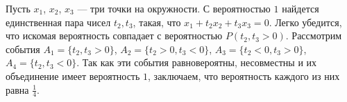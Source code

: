 \documentclass{article}
\begin{document}
Пусть $x_1$, $x_2$, $x_3$ --- три точки на окружности. С вероятностью $1$ найдется единственная пара чисел $t_2, t_3$, такая, что 
$x_1 + t_2 x_2 + t_3 x_3 = 0$. Легко убедится, что искомая вероятность совпадает с вероятностью $P(t_2, t_3 > 0)$. Рассмотрим события $A_1 = \{t_2, t_3 > 0\}$, $A_2 = \{t_2>0,t_3<0\}$, 
$A_3 = \{t_2<0, t_3>0\}$, $A_4 = \{t_2,t_3<0\}$. Так как эти события равновероятны, несовместны и их объединение имеет вероятность $1$, заключаем, что вероятность каждого из них равна $\frac{1}{4}$.
\end{document}
